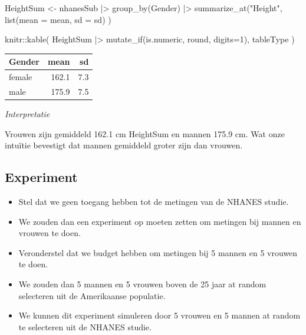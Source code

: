 \documentclass[
  dutch,
  letterpaper,
  12pt]{book}
\newenvironment{Shaded}{\begin{snugshade}}{\end{snugshade}}
\newcommand{\AttributeTok}[1]{\textcolor[rgb]{0.40,0.45,0.13}{#1}}
\newcommand{\DecValTok}[1]{\textcolor[rgb]{0.68,0.00,0.00}{#1}}
\newcommand{\FunctionTok}[1]{\textcolor[rgb]{0.28,0.35,0.67}{#1}}
\newcommand{\NormalTok}[1]{\textcolor[rgb]{0.00,0.23,0.31}{#1}}
\newcommand{\OtherTok}[1]{\textcolor[rgb]{0.00,0.23,0.31}{#1}}
\newcommand{\SpecialCharTok}[1]{\textcolor[rgb]{0.37,0.37,0.37}{#1}}
\newcommand{\StringTok}[1]{\textcolor[rgb]{0.13,0.47,0.30}{#1}}
\theoremstyle{definition}
\theoremstyle{definition}
\theoremstyle{definition}
\theoremstyle{remark}
\begin{document}
\begin{Shaded}
\begin{Highlighting}[]
\NormalTok{HeightSum }\OtherTok{\textless{}{-}}\NormalTok{ nhanesSub }\SpecialCharTok{|\textgreater{}}
  \FunctionTok{group\_by}\NormalTok{(Gender) }\SpecialCharTok{|\textgreater{}}
  \FunctionTok{summarize\_at}\NormalTok{(}\StringTok{"Height"}\NormalTok{,}
               \FunctionTok{list}\NormalTok{(}\AttributeTok{mean =}\NormalTok{ mean,}
               \AttributeTok{sd =}\NormalTok{ sd)}
\NormalTok{              )}

\NormalTok{knitr}\SpecialCharTok{::}\FunctionTok{kable}\NormalTok{(}
\NormalTok{  HeightSum }\SpecialCharTok{|\textgreater{}}
  \FunctionTok{mutate\_if}\NormalTok{(is.numeric, round, }\AttributeTok{digits=}\DecValTok{1}\NormalTok{),}
\NormalTok{  tableType}
\NormalTok{  )}
\end{Highlighting}
\end{Shaded}

\begin{tabular}{l|r|r}
\hline
Gender & mean & sd\\
\hline
female & 162.1 & 7.3\\
\hline
male & 175.9 & 7.5\\
\hline
\end{tabular}

\emph{Interpretatie}

Vrouwen zijn gemiddeld 162.1 cm HeightSum en mannen 175.9 cm. Wat onze
intuïtie bevestigt dat mannen gemiddeld groter zijn dan vrouwen.

\subsection{Experiment}\label{experiment}

\begin{itemize}
\item
  Stel dat we geen toegang hebben tot de metingen van de NHANES studie.
\item
  We zouden dan een experiment op moeten zetten om metingen bij mannen
  en vrouwen te doen.
\item
  Veronderstel dat we budget hebben om metingen bij 5 mannen en 5
  vrouwen te doen.
\item
  We zouden dan 5 mannen en 5 vrouwen boven de 25 jaar at random
  selecteren uit de Amerikaanse populatie.
\item
  We kunnen dit experiment simuleren door 5 vrouwen en 5 mannen at
  random te selecteren uit de NHANES studie.
\end{itemize}
\end{document}
